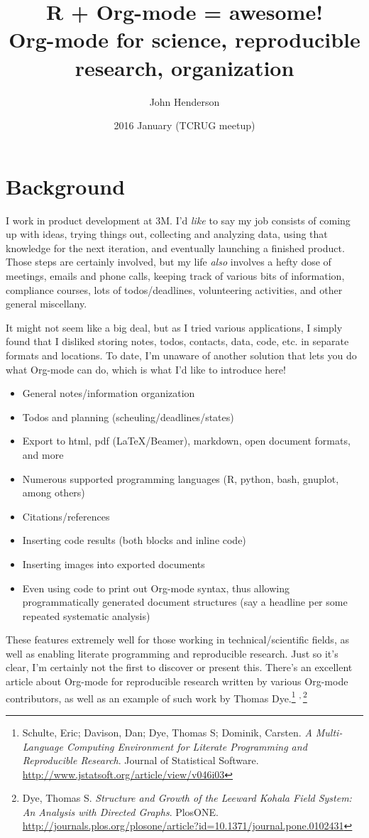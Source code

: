 \documentclass[11pt]{article}
\author{John Henderson}
\date{2016 January (TCRUG meetup)}
\title{R + Org-mode = awesome!\\\medskip
\large Org-mode for science, reproducible research, organization}
\begin{document}
\maketitle


\section*{Background}
\label{sec:orgheadline1}

I work in product development at 3M. I'd \emph{like} to say my job consists
of coming up with ideas, trying things out, collecting and analyzing
data, using that knowledge for the next iteration, and eventually launching a finished
product. Those steps are certainly involved, but my life \emph{also} involves a hefty dose of
meetings, emails and phone calls, keeping track of various bits of information, compliance
courses, lots of todos/deadlines, volunteering activities, and other general miscellany.

It might not seem like a big deal, but as I tried various applications, I simply found
that I disliked storing notes, todos, contacts, data, code, etc. in separate formats and
locations. To date, I'm unaware of another solution that lets you do what Org-mode can do, which is
what I'd like to introduce here!
\begin{itemize}
\item General notes/information organization
\item Todos and planning (scheuling/deadlines/states)
\item Export to html, pdf (\LaTeX{}/Beamer), markdown, open document formats, and more
\item Numerous supported programming languages (R, python, bash, gnuplot, among others)
\item Citations/references
\item Inserting code results (both blocks and inline code)
\item Inserting images into exported documents
\item Even using code to print out Org-mode syntax, thus allowing programmatically generated
document structures (say a headline per some repeated systematic analysis)
\end{itemize}

These features extremely well for those working in technical/scientific fields, as well as
enabling literate programming and reproducible research. Just so it's clear, I'm certainly
not the first to discover or present this. There's an excellent article about Org-mode for
reproducible research written by various Org-mode contributors, as well as an
example of such work by Thomas Dye.\footnote{Schulte, Eric; Davison, Dan; Dye, Thomas S; Dominik, Carsten. \emph{A Multi-Language Computing Environment for Literate Programming and Reproducible Research}. 
Journal of Statistical Software. \url{http://www.jstatsoft.org/article/view/v046i03}} \textsuperscript{,}\,\footnote{Dye, Thomas S. \emph{Structure and Growth of the Leeward Kohala Field System: An
Analysis with Directed Graphs}. PlosONE. \url{http://journals.plos.org/plosone/article?id=10.1371/journal.pone.0102431}}
\end{document}
